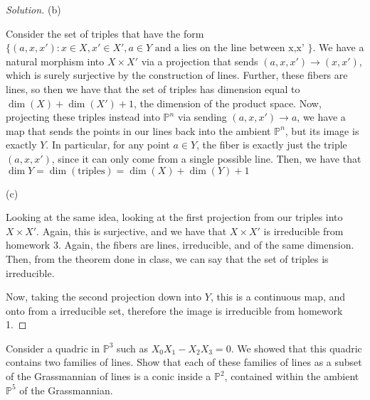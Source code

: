 \documentclass[10pt]{article}
\newenvironment{problem}[2][Problem]{\begin{trivlist}
\item[\hskip \labelsep {\bfseries #1}\hskip \labelsep {\bfseries #2.}]}{\end{trivlist}}
\begin{document}
\begin{proof}[Solution]
(b)

Consider the set of triples that have the form $\{ (a,x,x') : x \in X, x' \in X', a \in Y \text{ and a lies on the line between x,x' } \}$. We have a natural morphism into $X \times X'$ via a projection that sends $(a,x,x') \to (x,x')$, which is surely surjective by the construction of lines. Further, these fibers are lines, so then we have that the set of triples has dimension equal to  $\dim(X) + \dim(X') + 1$, the dimension of the product space. Now, projecting these triples instead into $\mathbb{P}^n$ via sending $(a,x,x') \to a$, we have a map that sends the points in our lines back into the ambient $\mathbb{P}^n$, but its image is exactly $Y$. In particular, for any point $a \in Y$, the fiber is exactly just the triple $(a,x,x')$, since it can only come from a single possible line. Then, we have that $\dim Y = \dim(\text{triples}) = \dim(X) + \dim(Y) + 1$

(c)

Looking at the same idea, looking at the first projection from our triples into $X \times X'$. Again, this is surjective, and we have that $X \times X'$ is irreducible from homework 3. Again, the fibers are lines, irreducible, and of the same dimension. Then, from the theorem done in class, we can say that the set of triples is irreducible.

Now, taking the second projection down into $Y$, this is a continuous map, and onto from a irreducible set, therefore the image is irreducible from homework 1.
\end{proof}

\begin{problem}{6.2}

Consider a quadric in $\mathbb{P}^3$ such as $X_0X_1 - X_2 X_3 = 0$. We showed that this quadric contains two families of lines. Show that each of these families of lines as a subset of the Grassmannian of lines is a conic inside a $\mathbb{P}^2$, contained within the ambient $\mathbb{P}^5$ of the Grassmannian.

\end{problem}
\end{document}
